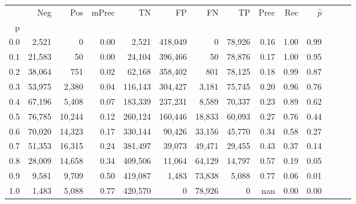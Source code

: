 \begin{tabular}{rrrrrrrrrrrrrr}
\toprule
{} &     Neg &     Pos & mPrec &       TN &       FP &      FN &      TP &  Prec &   Rec & $\hat{p}$ \\
p   &         &         &       &          &          &         &         &       &       &           \\
\midrule
0.0 &   2,521 &       0 &  0.00 &    2,521 &  418,049 &       0 &  78,926 &  0.16 &  1.00 &      0.99 \\
0.1 &  21,583 &      50 &  0.00 &   24,104 &  396,466 &      50 &  78,876 &  0.17 &  1.00 &      0.95 \\
0.2 &  38,064 &     751 &  0.02 &   62,168 &  358,402 &     801 &  78,125 &  0.18 &  0.99 &      0.87 \\
0.3 &  53,975 &   2,380 &  0.04 &  116,143 &  304,427 &   3,181 &  75,745 &  0.20 &  0.96 &      0.76 \\
0.4 &  67,196 &   5,408 &  0.07 &  183,339 &  237,231 &   8,589 &  70,337 &  0.23 &  0.89 &      0.62 \\
0.5 &  76,785 &  10,244 &  0.12 &  260,124 &  160,446 &  18,833 &  60,093 &  0.27 &  0.76 &      0.44 \\
0.6 &  70,020 &  14,323 &  0.17 &  330,144 &   90,426 &  33,156 &  45,770 &  0.34 &  0.58 &      0.27 \\
0.7 &  51,353 &  16,315 &  0.24 &  381,497 &   39,073 &  49,471 &  29,455 &  0.43 &  0.37 &      0.14 \\
0.8 &  28,009 &  14,658 &  0.34 &  409,506 &   11,064 &  64,129 &  14,797 &  0.57 &  0.19 &      0.05 \\
0.9 &   9,581 &   9,709 &  0.50 &  419,087 &    1,483 &  73,838 &   5,088 &  0.77 &  0.06 &      0.01 \\
1.0 &   1,483 &   5,088 &  0.77 &  420,570 &        0 &  78,926 &       0 &   nan &  0.00 &      0.00 \\
\bottomrule
\end{tabular}
